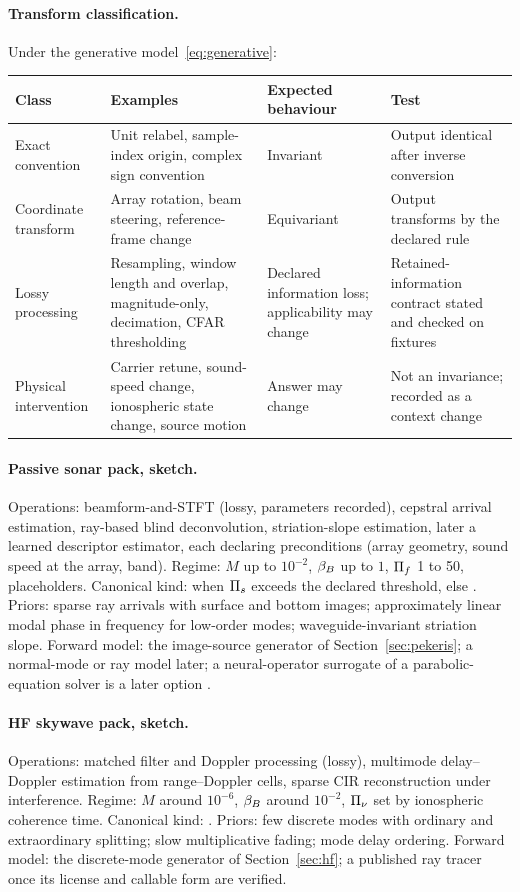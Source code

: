 \documentclass[11pt,a4paper]{article}
\begin{document}
\paragraph{Transform classification.} Under the generative model~\eqref{eq:generative}:
\begin{center}\small
\begin{tabular}{@{}p{2.6cm}p{4.2cm}p{3.6cm}p{4cm}@{}}
\toprule
Class & Examples & Expected behaviour & Test \\
\midrule
Exact convention & Unit relabel, sample-index origin, complex sign convention & Invariant & Output identical after inverse conversion \\
Coordinate transform & Array rotation, beam steering, reference-frame change & Equivariant & Output transforms by the declared rule \\
Lossy processing & Resampling, window length and overlap, magnitude-only, decimation, CFAR thresholding & Declared information loss; applicability may change & Retained-information contract stated and checked on fixtures \\
Physical intervention & Carrier retune, sound-speed change, ionospheric state change, source motion & Answer may change & Not an invariance; recorded as a context change \\
\bottomrule
\end{tabular}
\end{center}

\paragraph{Passive sonar pack, sketch.} Operations: beamform-and-STFT (lossy, parameters recorded), cepstral arrival estimation, ray-based blind deconvolution, striation-slope estimation, later a learned descriptor estimator, each declaring preconditions (array geometry, sound speed at the array, band). Regime: $M$ up to $10^{-2}$, $\beta_{B}$ up to $1$, $\Pi_{f}$ 1 to 50, placeholders. Canonical kind:  when $\Pi_{s}$ exceeds the declared threshold, else . Priors: sparse ray arrivals with surface and bottom images; approximately linear modal phase in frequency for low-order modes; waveguide-invariant striation slope. Forward model: the image-source generator of Section~\ref{sec:pekeris}; a normal-mode or ray model later; a neural-operator surrogate of a parabolic-equation solver is a later option \citep{kovachki2023}.

\paragraph{HF skywave pack, sketch.} Operations: matched filter and Doppler processing (lossy), multimode delay--Doppler estimation from range--Doppler cells, sparse CIR reconstruction under interference. Regime: $M$ around $10^{-6}$, $\beta_{B}$ around $10^{-2}$, $\Pi_{\nu}$ set by ionospheric coherence time. Canonical kind: . Priors: few discrete modes with ordinary and extraordinary splitting; slow multiplicative fading; mode delay ordering. Forward model: the discrete-mode generator of Section~\ref{sec:hf}; a published ray tracer once its license and callable form are verified.
\end{document}
